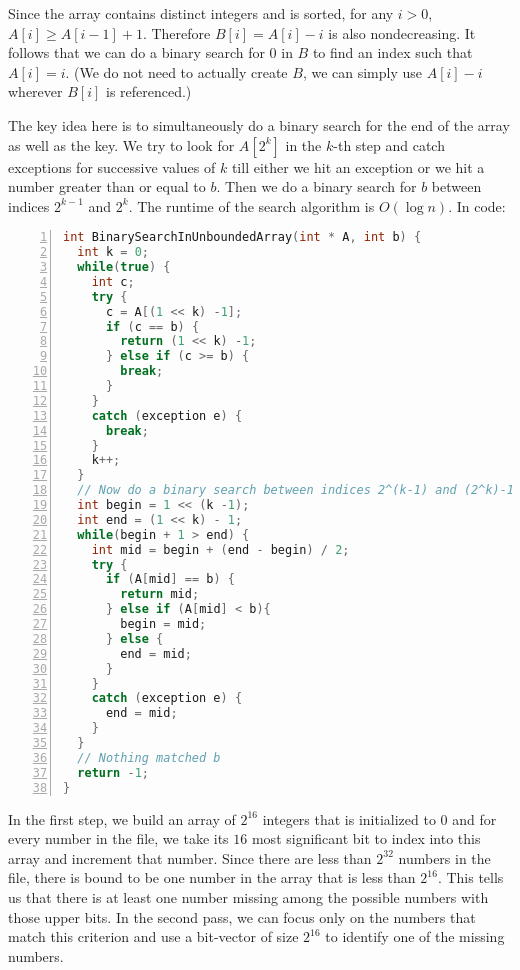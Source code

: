 \begin{comment}
On the other hand, if there are many expected duplicates, there is a crossover point after 
which the binary search does become faster. Specifically, that number is $\log_2\frac{n}{2})$; so, in 
the case of $1,000,000$, if we expect any more than 19 copies of each element in the sorted 
array, we are still better off using a second binary search to find the next highest 
number rather than a linear walk through 19 elements. Of course, the constant factors in 
the algorithm will have an impact as well, but which algorithm is better still depends on the amount of duplication relative to $n$.
\end{comment}

Since the array contains
distinct integers and is sorted, for any $i >0$, $A[i] \ge A[i-1] +1$.
Therefore $B[i] = A[i] -i$ is also nondecreasing. It follows that
we can do a binary search for 0 in $B$ to find an
index such that $A[i] = i$. 
(We do not need to actually create $B$, we can simply use $A[i] -i$ wherever $B[i]$ is referenced.)

The key idea here is to simultaneously do a binary search for the end
of the array as well as the key.
We try to look for $A[2^k]$ in the $k$-th step and 
catch exceptions for successive values of $k$ till either we hit an
exception or we hit a number greater than or equal to $b$. Then we do a
binary search for $b$ between indices $2^{k-1}$ and $2^k$.
The runtime of the search algorithm is $O(\log n)$. 
In code:
 \begin{lstlisting}[basicstyle=\footnotesize,numbers=left,breaklines=true,language=C++]
int BinarySearchInUnboundedArray(int * A, int b) {
  int k = 0;
  while(true) {
    int c;
    try {
      c = A[(1 << k) -1];
      if (c == b) {
        return (1 << k) -1;
      } else if (c >= b) {
        break;
      }
    }
    catch (exception e) {
      break;
    }
    k++;
  }
  // Now do a binary search between indices 2^(k-1) and (2^k)-1.
  int begin = 1 << (k -1);
  int end = (1 << k) - 1;
  while(begin + 1 > end) {
    int mid = begin + (end - begin) / 2;
    try {
      if (A[mid] == b) {
        return mid;
      } else if (A[mid] < b){
        begin = mid;
      } else {
        end = mid;
      }
    }
    catch (exception e) {
      end = mid;
    }
  }
  // Nothing matched b
  return -1;
}
 \end{lstlisting}


In the first step, we build an array of
$2^{16}$ integers that is initialized to $0$ and for every number in the file,
we take its $16$ most significant bit to index into this array and
increment that number. Since there are less than $2^{32}$ numbers in the
file, there is bound to be one number in the array that is less
than $2^{16}$. This tells us that there is at least one number missing
among the possible numbers with those upper bits. In the second pass,
we can focus only on the numbers that match this criterion and use a bit-vector of size $2^{16}$ to identify one of the missing
numbers.


